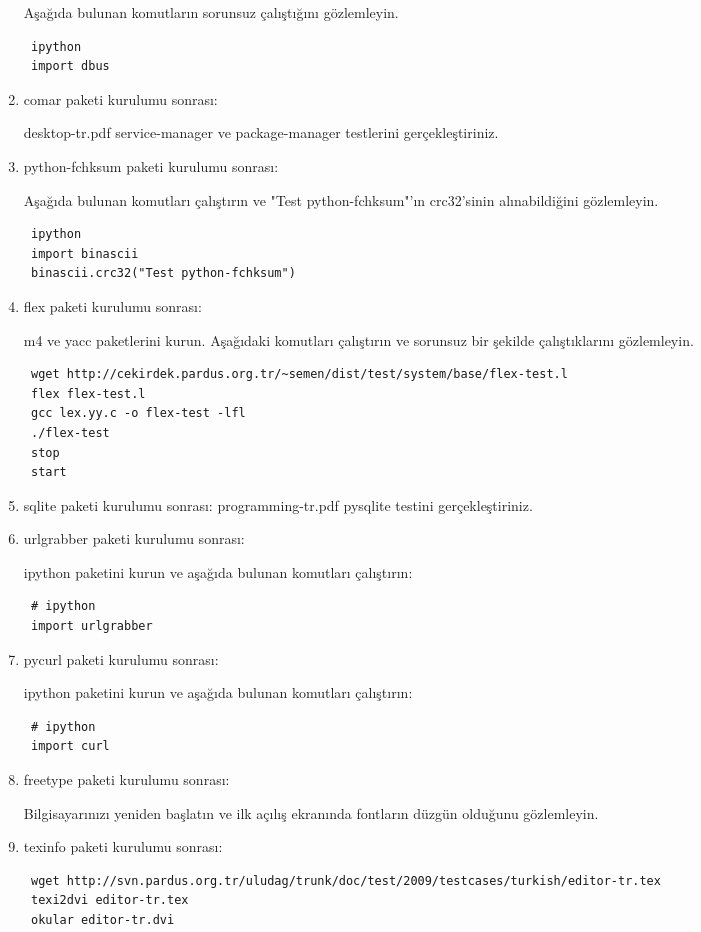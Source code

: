 \documentclass[a4paper,10pt]{article}
\begin{document}
\begin{enumerate}
Aşağıda bulunan komutların sorunsuz çalıştığını gözlemleyin.
\begin{verbatim}
 ipython
 import dbus
\end{verbatim}


\item comar paketi kurulumu sonrası:

desktop-tr.pdf service-manager ve package-manager testlerini gerçekleştiriniz.
\item python-fchksum paketi kurulumu sonrası:

Aşağıda bulunan komutları çalıştırın ve "Test python-fchksum"'ın crc32'sinin alınabildiğini gözlemleyin.
\begin{verbatim}
 ipython
 import binascii
 binascii.crc32("Test python-fchksum")
\end{verbatim}

\item flex paketi kurulumu sonrası:

m4 ve yacc paketlerini kurun.
Aşağıdaki komutları çalıştırın ve sorunsuz bir şekilde çalıştıklarını gözlemleyin.
\begin{verbatim}
 wget http://cekirdek.pardus.org.tr/~semen/dist/test/system/base/flex-test.l
 flex flex-test.l
 gcc lex.yy.c -o flex-test -lfl 
 ./flex-test
 stop
 start
\end{verbatim}


\item sqlite paketi kurulumu sonrası:
programming-tr.pdf pysqlite testini gerçekleştiriniz.

\item urlgrabber paketi kurulumu sonrası:

ipython paketini kurun ve aşağıda bulunan komutları çalıştırın:
\begin{verbatim}
 # ipython
 import urlgrabber
\end{verbatim}

\item pycurl paketi kurulumu sonrası:

ipython paketini kurun ve aşağıda bulunan komutları çalıştırın:
\begin{verbatim}
 # ipython
 import curl
\end{verbatim}

\item freetype paketi kurulumu sonrası: 

Bilgisayarınızı yeniden başlatın ve ilk açılış ekranında fontların düzgün olduğunu gözlemleyin.
\item texinfo paketi kurulumu sonrası:
\begin{verbatim}
 wget http://svn.pardus.org.tr/uludag/trunk/doc/test/2009/testcases/turkish/editor-tr.tex
 texi2dvi editor-tr.tex
 okular editor-tr.dvi
\end{verbatim}



\end{enumerate}
\end{document}
